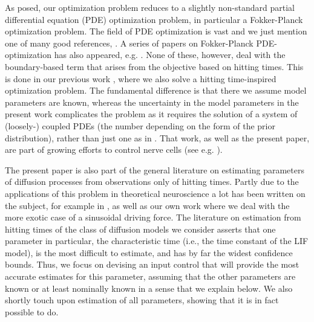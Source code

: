 \documentclass[12pt]{article}
\begin{document}
As posed, our optimization problem reduces to a slightly non-standard partial
differential equation (PDE) optimization problem, in particular a Fokker-Planck
optimization problem. The field of PDE optimization is vast and we just mention
one of many good references, \cite{Borzi2012}. A series of papers on
Fokker-Planck PDE-optimization has also appeared, e.g.
\cite{Annunziato2010,Annunziato2014}. None of these, however, deal with the
boundary-based term that arises from the objective based on hitting times. This
is done in our previous work \cite{Iolov2014a}, where we also solve a hitting
time-inspired optimization problem. The fundamental difference is that there we
assume model parameters are known, whereas the uncertainty in the model
parameters in the present work complicates the problem as it requires the
solution of a system of (loosely-) coupled PDEs (the number depending on the
form of the prior distribution), rather than just one as in \cite{Iolov2014a}.
That work, as well as the present paper, are part of growing efforts to control
nerve cells (see e.g. \cite{Ullah2009}).

The present paper is also part of the general literature on estimating
parameters of diffusion processes from observations only of hitting times.
Partly due to the applications of this problem in theoretical neuroscience a lot
has been written on the subject, for example in
\cite{Paninski2004,Ditlevsen2007,Lansky2008,MullowneyIyengar2008}, as well as
our own work \cite{Iolov2013} where we deal with the more exotic case of a
sinusoidal driving force. The literature on estimation from hitting times of the
class of diffusion models we consider asserts that one parameter in particular,
the characteristic time (i.e., the time constant of the LIF model), is the most
difficult to estimate, and has by far the widest confidence bounds. Thus, we
focus on devising an input control that will provide the most accurate estimates
for this parameter, assuming that the other parameters are known or at least
nominally known in a sense that we explain below. We also shortly touch upon
estimation of all parameters, showing that it is in fact possible to do.
\end{document}

